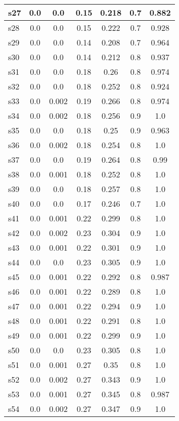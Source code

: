 \documentclass{article}
\begin{document}
\begin{tabular}{|l|c|c|c|c|c|c|}
\hline
s27 &0.0 & 0.0 & 0.15 & 0.218 & 0.7 & 0.882\\
\hline
s28 &0.0 & 0.0 & 0.15 & 0.222 & 0.7 & 0.928\\
\hline
s29 &0.0 & 0.0 & 0.14 & 0.208 & 0.7 & 0.964\\
\hline
s30 &0.0 & 0.0 & 0.14 & 0.212 & 0.8 & 0.937\\
\hline
s31 &0.0 & 0.0 & 0.18 & 0.26 & 0.8 & 0.974\\
\hline
s32 &0.0 & 0.0 & 0.18 & 0.252 & 0.8 & 0.924\\
\hline
s33 &0.0 & 0.002 & 0.19 & 0.266 & 0.8 & 0.974\\
\hline
s34 &0.0 & 0.002 & 0.18 & 0.256 & 0.9 & 1.0\\
\hline
s35 &0.0 & 0.0 & 0.18 & 0.25 & 0.9 & 0.963\\
\hline
s36 &0.0 & 0.002 & 0.18 & 0.254 & 0.8 & 1.0\\
\hline
s37 &0.0 & 0.0 & 0.19 & 0.264 & 0.8 & 0.99\\
\hline
s38 &0.0 & 0.001 & 0.18 & 0.252 & 0.8 & 1.0\\
\hline
s39 &0.0 & 0.0 & 0.18 & 0.257 & 0.8 & 1.0\\
\hline
s40 &0.0 & 0.0 & 0.17 & 0.246 & 0.7 & 1.0\\
\hline
s41 &0.0 & 0.001 & 0.22 & 0.299 & 0.8 & 1.0\\
\hline
s42 &0.0 & 0.002 & 0.23 & 0.304 & 0.9 & 1.0\\
\hline
s43 &0.0 & 0.001 & 0.22 & 0.301 & 0.9 & 1.0\\
\hline
s44 &0.0 & 0.0 & 0.23 & 0.305 & 0.9 & 1.0\\
\hline
s45 &0.0 & 0.001 & 0.22 & 0.292 & 0.8 & 0.987\\
\hline
s46 &0.0 & 0.001 & 0.22 & 0.289 & 0.8 & 1.0\\
\hline
s47 &0.0 & 0.001 & 0.22 & 0.294 & 0.9 & 1.0\\
\hline
s48 &0.0 & 0.001 & 0.22 & 0.291 & 0.8 & 1.0\\
\hline
s49 &0.0 & 0.001 & 0.22 & 0.299 & 0.9 & 1.0\\
\hline
s50 &0.0 & 0.0 & 0.23 & 0.305 & 0.8 & 1.0\\
\hline
s51 &0.0 & 0.001 & 0.27 & 0.35 & 0.8 & 1.0\\
\hline
s52 &0.0 & 0.002 & 0.27 & 0.343 & 0.9 & 1.0\\
\hline
s53 &0.0 & 0.001 & 0.27 & 0.345 & 0.8 & 0.987\\
\hline
s54 &0.0 & 0.002 & 0.27 & 0.347 & 0.9 & 1.0\\
\hline

\end{tabular}
\end{document}
